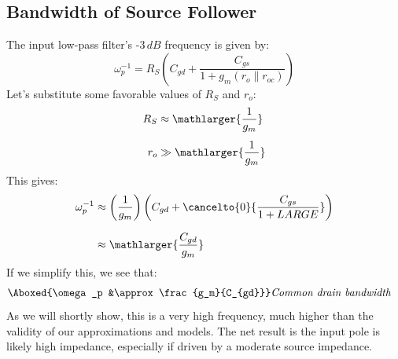 \subsection{Bandwidth of Source Follower}
The input low-pass filter’s -$3\,dB$ frequency is given by:
    \begin{equation} 
        \omega_p^{-1} = R_S\left(C_{gd} + \frac{C_{gs}}{1 + g_m \left(r_o \parallel r_{oc}\right)}\right)
    \end{equation}
Let's substitute some favorable values of $R_S$ and $r_o$:
    \begin{align} 
        R_S &\approx \mathlarger{\frac{1}{g_m}}\\[0.15cm]
        r_o &\gg \mathlarger{\frac{1}{g_m}}
    \end{align}
This gives:
    \begin{align} 
        \omega_p^{-1} &\approx \left(\frac{1}{g_m}\right)
                                \left(C_{gd} + \cancelto{0}{\frac{C_{gs}}{1 + LARGE}}\right)\\[0.25cm]
        &\approx \mathlarger{\frac{C_{gd}}{g_m}}
    \end{align}
If we simplify this, we see that:
    \begin{align}
        \Aboxed{\omega_p &\approx \frac{g_m}{C_{gd}}}
        &\textit{Common drain bandwidth}
        \label{eq:cd_bandwidth}
    \end{align}
As we will shortly show, this is a very high frequency, much higher than the validity of our approximations and models.  The net result is the input pole is likely high impedance, especially if driven by a moderate source impedance.
